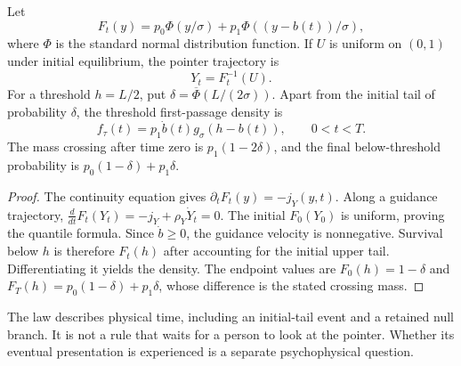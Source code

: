 \begin{theorem}\label{thm:pointer}
Let
\[
F_t(y)=p_0\Phi(y/\sigma)+p_1\Phi((y-b(t))/\sigma),
\]
where $\Phi$ is the standard normal distribution function. If $U$ is uniform on $(0,1)$ under initial equilibrium, the pointer trajectory is
\[
Y_t=F_t^{-1}(U).
\]
For a threshold $h=L/2$, put $\delta=\overline\Phi(L/(2\sigma))$. Apart from the initial tail of probability $\delta$, the threshold first-passage density is
\[
f_\tau(t)=p_1\dot b(t)g_\sigma(h-b(t)),\qquad0<t<T.
\]
The mass crossing after time zero is $p_1(1-2\delta)$, and the final below-threshold probability is $p_0(1-\delta)+p_1\delta$.
\end{theorem}
\begin{proof}
The continuity equation gives $\partial_tF_t(y)=-j_Y(y,t)$. Along a guidance trajectory,
$\frac{d}{dt}F_t(Y_t)=-j_Y+\rho_Y\dot Y_t=0$.
The initial $F_0(Y_0)$ is uniform, proving the quantile formula. Since $\dot b\ge0$, the guidance velocity is nonnegative. Survival below $h$ is therefore $F_t(h)$ after accounting for the initial upper tail. Differentiating it yields the density. The endpoint values are $F_0(h)=1-\delta$ and $F_T(h)=p_0(1-\delta)+p_1\delta$, whose difference is the stated crossing mass.
\end{proof}

The law describes physical time, including an initial-tail event and a retained null branch. It is not a rule that waits for a person to look at the pointer. Whether its eventual presentation is experienced is a separate psychophysical question.

